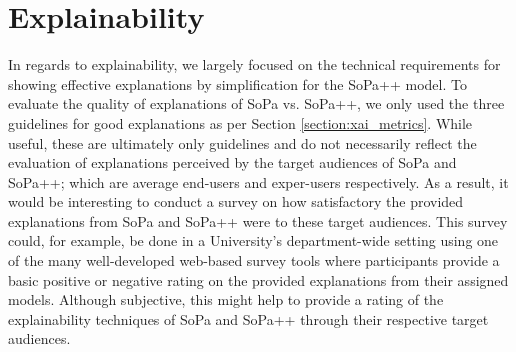 \section{Explainability}

In regards to explainability, we largely focused on the technical requirements
for showing effective explanations by simplification for the SoPa++ model. To
evaluate the quality of explanations of SoPa vs. SoPa++, we only used the three
guidelines for good explanations as per Section \ref{section:xai_metrics}. While
useful, these are ultimately only guidelines and do not necessarily reflect the
evaluation of explanations perceived by the target audiences of SoPa and SoPa++;
which are average end-users and exper-users respectively. As a result, it would
be interesting to conduct a survey on how satisfactory the provided explanations
from SoPa and SoPa++ were to these target audiences. This survey could, for
example, be done in a University's department-wide setting using one of the many
well-developed web-based survey tools where participants provide a basic
positive or negative rating on the provided explanations from their assigned
models. Although subjective, this might help to provide a rating of the
explainability techniques of SoPa and SoPa++ through their respective target
audiences.


